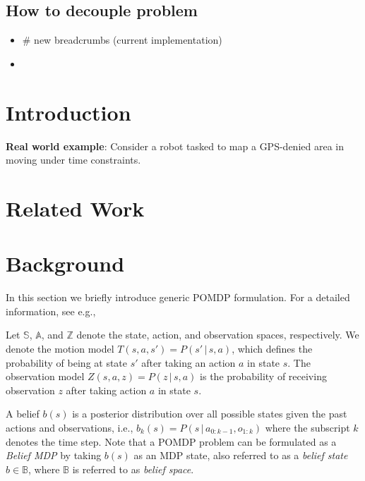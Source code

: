 \documentclass[letterpaper, 10 pt, conference]{ieeeconf}  %
\newcommand{\ph}[1]{{\textbf{#1}:}} %
\begin{document}
\subsection{How to decouple problem}
\begin{itemize}
    \item \# new breadcrumbs (current implementation)
    \item 
\end{itemize}

\section{Introduction}
\ph{Real world example} Consider a robot tasked to map a GPS-denied area in moving under time constraints. 


\section{Related Work}


\section{Background}


In this section we briefly introduce generic POMDP formulation.
For a detailed information, see e.g.,~\cite{Bertsekas05,TBF05,RN10}

Let $\mathbb{S}$, $\mathbb{A}$, and $\mathbb{Z}$ denote the state, action, and observation spaces, respectively.
We denote the motion model $T(s, a, s') = P(s'\,|\,s, a)$, which defines the probability of being at state $s'$ after taking an action $a$ in state $s$.
The observation model $Z(s, a, z) = P(z\,|\,s, a)$ is the probability of receiving observation $z$ after taking action $a$ in state $s$. 

A belief $b(s)$ is a posterior distribution over all possible states given the past actions and observations, i.e., $b_{k}(s) = P(s \,|\, a_{0:k-1}, o_{1:k})$ where the subscript $k$ denotes the time step.
Note that a POMDP problem can be formulated as a \textit{Belief MDP} by taking $b(s)$ as an MDP state, also referred to as a \textit{belief state} $b \in \mathbb{B}$, where $\mathbb{B}$ is referred to as \textit{belief space}.
\end{document}
